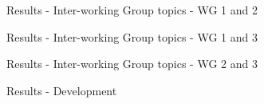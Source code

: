 \documentclass[9pt]{beamer}
\begin{document}
\begin{frame}{Results - Inter-working Group topics - WG 1 and 2}
	
	\begin{table}
		
		
		
		
	\end{table}
	
\end{frame}

\begin{frame}{Results - Inter-working Group topics - WG 1 and 3}

\begin{table}
	
	
	
	
\end{table}

\end{frame}


\begin{frame}{Results - Inter-working Group topics - WG 2 and 3}

\begin{table}




\end{table}

\end{frame}


\begin{frame}{Results - Development}
\end{frame}
\end{document}

